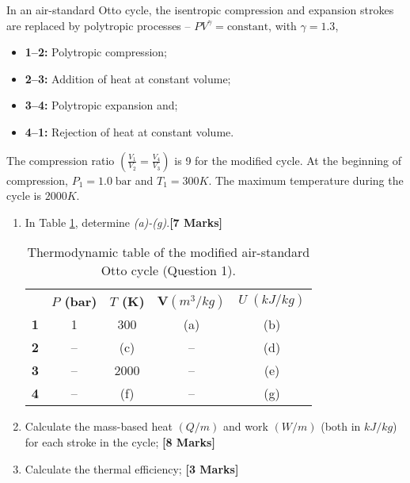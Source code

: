 \documentclass[calculator,steamtables,refrigeranttables]{exam}
\newcommand{\frc}{\displaystyle\frac}
\begin{document}
\begin{question} In an air-standard Otto cycle, the isentropic compression and expansion strokes are replaced by polytropic processes -- $PV^{\gamma}=\text{constant}$, with $\gamma=1.3$,
\begin{itemize}
\item {\bf 1--2:} Polytropic compression;
\item {\bf 2--3:} Addition of heat at constant volume;
\item {\bf 3--4:} Polytropic expansion and;
\item {\bf 4--1:} Rejection of heat at constant volume. 
\end{itemize}
The compression ratio $\left(\frc{V_{1}}{V_{2}}=\frc{V_{4}}{V_{3}}\right)$ is 9 for the modified cycle. At the beginning of compression, $P_{1}=1.0\;\text{bar}$ and $T_{1}=300K$. The maximum temperature during the cycle is $2000K$. 
\begin{enumerate}
\item In Table \ref{exam2_table1}, determine {\it (a)-(g)}.{\bf [7 Marks]}
\begin{table}[h]
\begin{center}
\begin{tabular}{|| c | c c c c || }
\hline\hline
        & {\bf $P$ (bar)} & {\bf $T$ (K)}  & {\bf V$\left(m^{3}/kg\right)$} & {\bf $U\;\left(kJ/kg\right)$} \\
{\bf 1} & 1               &     300        &       (a)                      & (b)                 \\    
{\bf 2} & --              &     (c)        &       --                      &  (d)                 \\
{\bf 3} & --              &    2000        &       --                       & (e)                 \\
{\bf 4} & --              &    (f)         &       --                      &  (g)                 \\
\hline\hline
\end{tabular}
\end{center}
\caption{Thermodynamic table of the modified air-standard Otto cycle (Question 1).}\label{exam2_table1}
\end{table}
%
\item Calculate the mass-based heat $\left(Q/m\right)$ and work $\left(W/m\right)$ (both in $kJ/kg$) for each stroke in the cycle; {\bf [8 Marks]}
%
\item Calculate the thermal efficiency; {\bf [3 Marks]}

\end{enumerate}
\end{question}
\end{document}
